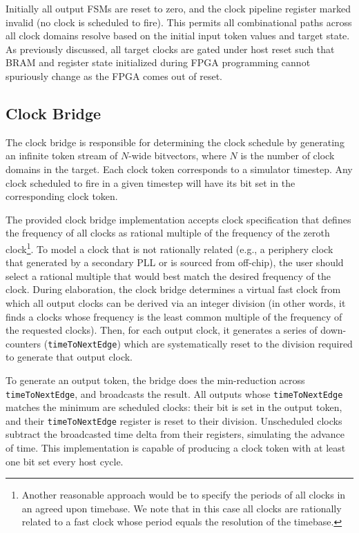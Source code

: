 
Initially all output FSMs are reset to zero, and the clock pipeline
register marked invalid (no clock is scheduled to fire).  This permits all combinational paths across all clock domains resolve based on the
initial input token values and target state.  As previously discussed, all
target clocks are gated under host reset such that BRAM and register state
initialized during FPGA programming cannot spuriously change as the FPGA comes
out of reset.

\subsection{Clock Bridge}

The clock bridge is responsible for determining the clock schedule by
generating an infinite token stream of $N$-wide bitvectors, where $N$ is the
number of clock domains in the target. Each clock token corresponds to a
simulator timestep. Any clock scheduled to fire in a given timestep will have
its bit set in the corresponding clock token.

The provided clock bridge implementation accepts clock specification that
defines the frequency of all clocks as rational multiple of the
frequency of the zeroth clock\footnote{Another reasonable approach would be to
specify the periods of all clocks in an agreed upon timebase. We note
that in this case all clocks are rationally related to a fast clock whose
period equals the resolution of the timebase.}. To model a clock that is not
rationally related (e.g., a periphery clock that generated by a
secondary PLL or is sourced from off-chip), the user should select a rational
multiple that would best match the desired frequency of the clock.  During
elaboration, the clock bridge determines a virtual fast clock from which all
output clocks can be derived via an integer division (in other words, it finds
a clocks whose frequency is the least common multiple of the frequency of the
requested clocks). Then, for each output clock, it generates a series of
down-counters (\texttt{timeToNextEdge}) which are systematically reset to the
division required to generate that output clock.

To generate an output token, the bridge does the min-reduction across
\texttt{timeToNextEdge}, and broadcasts the result. All outputs whose
\texttt{timeToNextEdge} matches the minimum are scheduled clocks: their bit is
set in the output token, and their \texttt{timeToNextEdge} register is reset to
their division. Unscheduled clocks subtract the broadcasted time delta from
their registers, simulating the advance of time.  This implementation is
capable of producing a clock token with at least one bit set every host cycle.

